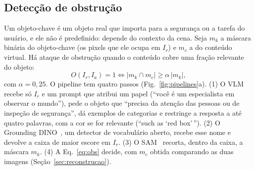 \documentclass[conference]{IEEEtran}
\newcommand{\Ir}{I_r}
\newcommand{\Ia}{I_a}
\begin{document}
\subsection{Detecção de obstrução}
\label{sec:viddar-obs}
Um objeto-chave é um objeto real que importa para a segurança ou a tarefa do usuário, e ele não é
predefinido: depende do contexto da cena. Seja $m_k$ a máscara binária do objeto-chave (os pixels que
ele ocupa em $\Ir$) e $m_c$ a do conteúdo virtual. Há ataque de obstrução quando o conteúdo cobre uma
fração relevante do objeto:
\begin{equation}
O(\Ir,\Ia)=1 \iff |m_k \cap m_c| \geq \alpha\,|m_k|,
\label{eq:obs}
\end{equation}
com $\alpha=0{,}25$. O pipeline tem quatro passos (Fig.~\ref{fig:pipelines}a). (1) O VLM recebe só
$\Ir$ e um prompt que atribui um papel (``você é um especialista em observar o mundo''), pede o objeto
que ``precisa da atenção das pessoas ou de inspeção de segurança'', dá exemplos de categorias e
restringe a resposta a até quatro palavras, com a cor se for relevante (``such as `red box'\,''). (2) O
Grounding DINO~\cite{groundingdino}, um detector de vocabulário aberto, recebe esse nome e devolve a
caixa de maior escore em $\Ir$. (3) O SAM~\cite{sam} recorta, dentro da caixa, a máscara $m_k$. (4) A
Eq.~\eqref{eq:obs} decide, com $m_c$ obtida comparando as duas imagens (Seção~\ref{sec:reconstrucao}).
\end{document}
